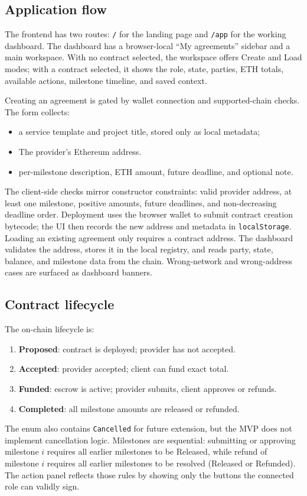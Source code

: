 \documentclass[12pt,a4paper]{article}
\begin{document}
\subsection{Application flow}

The frontend has two routes: \texttt{/} for the landing page and \texttt{/app}
for the working dashboard. The dashboard has a browser-local ``My agreements''
sidebar and a main workspace. With no contract selected, the workspace offers
Create and Load modes; with a contract selected, it shows the role, state,
parties, ETH totals, available actions, milestone timeline, and saved context.

Creating an agreement is gated by wallet connection and supported-chain checks.
The form collects:
\begin{itemize}
  \item a service template and project title, stored only as local metadata;
  \item The provider's Ethereum address.
  \item per-milestone description, ETH amount, future deadline, and optional note.
\end{itemize}

The client-side checks mirror constructor constraints: valid provider address,
at least one milestone, positive amounts, future deadlines, and non-decreasing
deadline order. Deployment uses the browser wallet to submit contract creation
bytecode; the UI then records the new address and metadata in \texttt{localStorage}.
Loading an existing agreement only requires a contract address. The dashboard
validates the address, stores it in the local registry, and reads party, state,
balance, and milestone data from the chain. Wrong-network and wrong-address
cases are surfaced as dashboard banners.

\subsection{Contract lifecycle}

The on-chain lifecycle is:
\begin{enumerate}
  \item \textbf{Proposed}: contract is deployed; provider has not accepted.
  \item \textbf{Accepted}: provider accepted; client can fund exact total.
  \item \textbf{Funded}: escrow is active; provider submits, client approves or refunds.
  \item \textbf{Completed}: all milestone amounts are released or refunded.
\end{enumerate}
The enum also contains \texttt{Cancelled} for future extension, but the MVP does
not implement cancellation logic. Milestones are sequential: submitting or
approving milestone $i$ requires all earlier milestones to be Released, while
refund of milestone $i$ requires all earlier milestones to be resolved
(Released or Refunded). The action panel reflects those rules by showing only
the buttons the connected role can validly sign.
\end{document}
